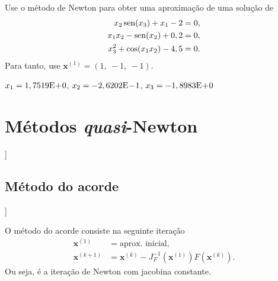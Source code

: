 \begin{exer}\label{ex:newton_exec}
  Use o método de Newton para obter uma aproximação de uma solução de
  \begin{align}
    x_2\operatorname{sen}(x_3)+x_1-2&=0,\\
    x_1x_2-\operatorname{sen}(x_2)+0,2&=0,\\
    x_3^2+\cos(x_1x_2)-4,5&=0.
  \end{align}
Para tanto, use $\pmb{x}^{(1)} = (1,~-1,~-1)$.
\end{exer}
\begin{resp}
  $x_1 = 1,7519\mathrm{E}\!+\!0$, $x_2 = -2,6202\mathrm{E}\!-\!1$, $x_3 =-1,8983\mathrm{E}\!+\!0$
\end{resp}

\section{Métodos {\it quasi}-Newton}\label{cap_snl_sec_quasi_newton}

\begin{flushleft}
  [[tag:revisar]]
\end{flushleft}

\subsection{Método do acorde}

\begin{flushleft}
  [[tag:revisar]]
\end{flushleft}

O método do acorde consiste na seguinte iteração
\begin{align}
  \pmb{x}^{(1)} &= \text{aprox. inicial},\\
  \pmb{x}^{(k+1)} &= \pmb{x}^{(k)} - J_F^{-1}(\pmb{x}^{(1)})F(\pmb{x}^{(k)}).
\end{align}
Ou seja, é a iteração de Newton com jacobina constante.

